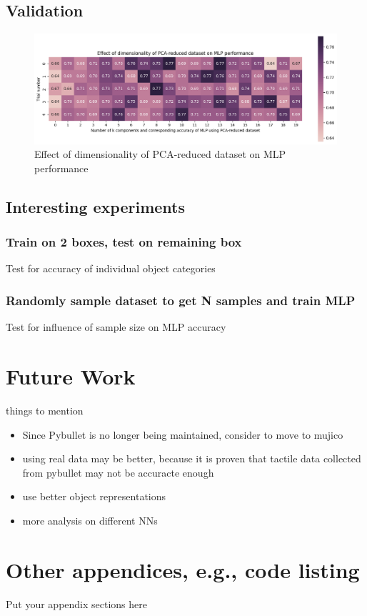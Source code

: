 \documentclass[11pt, a4paper]{report}
\begin{document}
\section{Validation}
\begin{figure}[H]
    \centering
    \includegraphics[scale=0.55]{docs/Project Report/Media/mlp_pca_accuracy_analysis.png}
    \caption{Effect of dimensionality of PCA-reduced dataset on MLP performance}
    \label{fig:my_label}
\end{figure}


\section{Interesting experiments}
\subsection{Train on 2 boxes, test on remaining box}
Test for accuracy of individual object categories


\subsection{Randomly sample dataset to get N samples and train MLP}
Test for influence of sample size on MLP accuracy


\chapter{Future Work}
\label{chap:6}
things to mention
\begin{itemize}
    \item Since Pybullet is no longer being maintained, consider to move to mujico
    \item using real data may be better, because it is proven that tactile data collected from pybullet may not be accuracte enough
    \item use better object representations
    \item more analysis on different NNs
\end{itemize}




\appendix
\printbibliography

\chapter{Other appendices, e.g., code listing}
Put your appendix sections here
\end{document}
